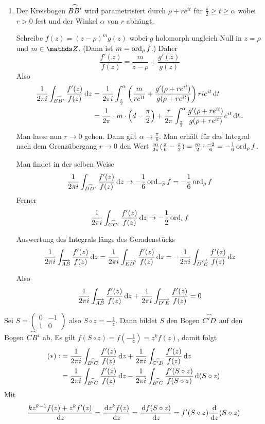 \begin{bewe}
\begin{enumerate}
		\item Der Kreisbogen $\stackrel{\frown}{BB'}$ wird parametrisiert durch $\rho + re^{it}$ für $\frac{\pi}{2} \geq t \geq \alpha$ wobei $r > 0$ fest und der Winkel $\alpha$ von $r$ abhängt.
		
		Schreibe $f(z) = (z - \rho)^m g(z)$ wobei $g$ holomorph ungleich Null in $z = \rho$ und $m \in \ZZ$. (Dann ist $m = \operatorname{ord}_\rho f$.)
		Daher 
		\[
		\frac{f'(z)}{f(z)} = \frac{m}{z-\rho} + \frac{g'(z)}{g(z)}
		\]
		Also
		\begin{align*}
		\frac{1}{2\pi i} \int_{\stackrel{\frown}{BB'}} \frac{f'(z)}{f(z)} \,\mathrm{d} z
		&= \frac{1}{2\pi i} \int_{\frac{\pi}{2}}^\alpha \left(\frac{m}{re^{it}} + \frac{g'(\rho + re^{it})}{g(\rho + re^{it})}\right) ri e^{it} \,\mathrm{d} t \\
		&= \frac{1}{2\pi} \cdot m \cdot \left(d- \frac{\pi}{2}\right) + \frac{r}{2\pi} \int_{\frac{\pi}{2}}^\alpha \frac{g'(\rho + re^{it})}{g(\rho + re^{it})} e^{it} \,\mathrm{d} t
		\,.
		\end{align*}
		Man lasse nun $r \to 0$ gehen. Dann gilt $\alpha \to \frac{\pi}{6}$.
		Man erhält für das Integral nach dem Grenzübergang $r \to 0$ den Wert $\frac{m}{2\pi} (\frac{\pi}{6} - \frac{\pi}{2}) = \frac{m}{2} \cdot \frac{-2}{6} = -\frac{1}{6} \operatorname{ord}_\rho f$.
		
		Man findet in der selben Weise
		\[
		\frac{1}{2\pi i} \int_{\stackrel{\frown}{DD'}} \frac{f'(z)}{f(z)} \,\mathrm{d} z \to -\frac{1}{6} \operatorname{ord}_{-\overline{\rho}} f = - \frac{1}{6} \operatorname{ord}_\rho f
		\]
		Ferner
		\[
		\frac{1}{2\pi i} \int_{\stackrel{\frown}{CC'}} \frac{f'(z)}{f(z)} \,\mathrm{d} z \to - \frac{1}{2} \operatorname{ord}_i f
		\]
		
		Auswertung des Integrals längs des Geradenstücks
		\[
		\frac{1}{2\pi i} \int_{\overrightarrow{AB}} \frac{f'(z)}{f(z)} \,\mathrm{d} z
		= \frac{1}{2\pi i} \int_{\overrightarrow{ED'}} \frac{f'(z)}{f(z)} \,\mathrm{d} z
		= - \frac{1}{2\pi i} \int_{\overrightarrow{D'E}} \frac{f'(z)}{f(z)} \,\mathrm{d} z
		\]
		
		Also
		\[
		\frac{1}{2\pi i} \int_{\overrightarrow{AB}} \frac{f'(z)}{f(z)} \,\mathrm{d} z + \frac{1}{2\pi i} \int_{\overrightarrow{D'E}} \frac{f'(z)}{f(z)} = 0
		\]
	\end{enumerate}
	
	
	Sei $S = (\begin{smallmatrix} 0 & -1 \\ 1 & 0 \end{smallmatrix})$ also $S \circ z = - \frac{1}{z}$.
	Dann bildet $S$ den Bogen $\stackrel{\frown}{C'D}$ auf den Bogen $\stackrel{\frown}{CB'}$ ab.
	Es gilt $f(S \circ z) = f(-\frac{1}{z}) = z^kf(z)$, damit folgt
	\begin{align*}
	(*) :&= \frac{1}{2\pi i} \int_{\stackrel{\frown}{B'C}} \frac{f'(z)}{f(z)} \,\mathrm{d} z + \frac{1}{2\pi i} \int_{\stackrel{\frown}{C'D}} \frac{f'(z)}{f(z)} \,\mathrm{d} z\\
	&= \frac{1}{2\pi i} \int_{\stackrel{\frown}{B'C}} \frac{f'(z)}{f(z)} \,\mathrm{d} z - \frac{1}{2\pi i} \int_{\stackrel{\frown}{B'C}} \frac{f'(S \circ z)}{f(S \circ z)} \,\mathrm{d} (S \circ z)
	\end{align*}
	Mit
	\[
	\frac{kz^{k-1}f(z) + z^kf'(z)}{\opd z}
	= \derive[z^kf(z)]
	= \derive[f(S \circ z)]
	= f'(S \circ z) \derive (S \circ z)
	\]
	

\end{bewe}
